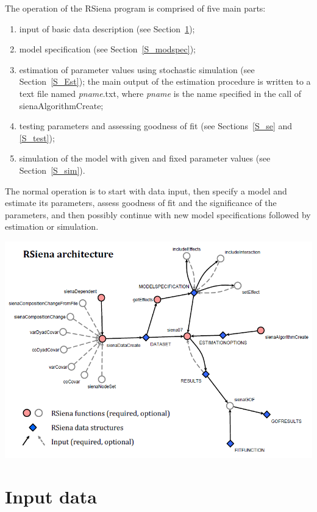 \documentclass[a4paper,fleqn,11pt]{article}
\newcommand{\+}{\, + \,}
\newcommand{\RS}{{\sf \textsf{RSiena} }}
\begin{document}
The operation of the \RS program is comprised of five main parts:
\begin{enumerate}
 \item input of basic data description (see Section~\ref{S_InputData});
 \item model specification (see Section~\ref{S_modspec});
 \item estimation of parameter values using stochastic simulation
        (see Section~\ref{S_Est});
    the main output of the estimation procedure
    is written to a text file named
    \textsf{\textsl{pname}.txt}, where \textsf{\textsl{pname}} is the name
    specified in the call of \textsf{sienaAlgorithmCreate};
 \item testing parameters and assessing goodness of fit
        (see Sections~\ref{S_se} and \ref{S_test});
 \item simulation of the model with given and fixed parameter values
        (see Section~\ref{S_sim}).
\end{enumerate}

The normal operation is to start with data input, then specify a
model and estimate its parameters,
assess goodness of fit and the significance of the parameters,
and then possibly continue with new
model specifications followed by estimation or simulation.


\vfill
\begin{center}
\includegraphics*[scale=0.7]{RSienaArchitecture.png}
\end{center}
\vfill




\newpage

\section{Input data}
\label{S_InputData}
\end{document}
